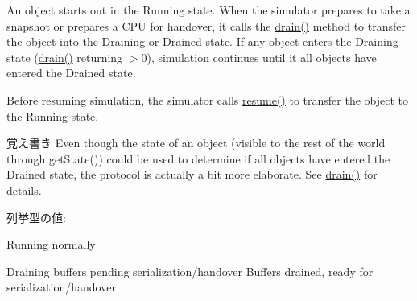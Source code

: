 An object starts out in the Running state. When the simulator prepares to take a snapshot or prepares a CPU for handover, it calls the \hyperlink{classDrainable_a1ed42c14f2f622ea6b0df3865e89c8b4}{drain()} method to transfer the object into the Draining or Drained state. If any object enters the Draining state (\hyperlink{classDrainable_a1ed42c14f2f622ea6b0df3865e89c8b4}{drain()} returning $>$0), simulation continues until it all objects have entered the Drained state.

Before resuming simulation, the simulator calls \hyperlink{namespacem5_1_1simulate_a2985608bac11887a6ae3df9b068b10fe}{resume()} to transfer the object to the Running state.

\begin{DoxyNote}{覚え書き}
Even though the state of an object (visible to the rest of the world through getState()) could be used to determine if all objects have entered the Drained state, the protocol is actually a bit more elaborate. See \hyperlink{classDrainable_a1ed42c14f2f622ea6b0df3865e89c8b4}{drain()} for details. 
\end{DoxyNote}
\begin{Desc}
\item[列挙型の値: ]\par
\begin{description}
\item[{\em 
\hypertarget{classDrainable_a5d74787dedbc4e11c1ab15bf487e61f8a2f5f2c4a8c4f4f0519d503dcdfbf55cb}{
Running}
\label{classDrainable_a5d74787dedbc4e11c1ab15bf487e61f8a2f5f2c4a8c4f4f0519d503dcdfbf55cb}
}]\item[{\em 
\hypertarget{classDrainable_a5d74787dedbc4e11c1ab15bf487e61f8a929d17847bfad0d4689c9ab8540d5134}{
Draining}
\label{classDrainable_a5d74787dedbc4e11c1ab15bf487e61f8a929d17847bfad0d4689c9ab8540d5134}
}]Running normally \item[{\em 
\hypertarget{classDrainable_a5d74787dedbc4e11c1ab15bf487e61f8a5656955cb808502a2ec75b367e2c1e82}{
Drained}
\label{classDrainable_a5d74787dedbc4e11c1ab15bf487e61f8a5656955cb808502a2ec75b367e2c1e82}
}]Draining buffers pending serialization/handover Buffers drained, ready for serialization/handover \end{description}
\end{Desc}




